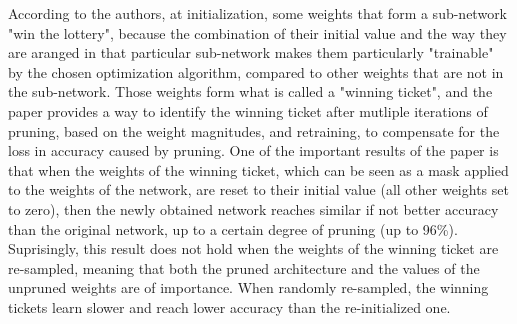 According to the authors, at initialization, some weights that form a sub-network "win the lottery", because the combination of their initial value and the way they are aranged in that particular sub-network makes them particularly "trainable" by the chosen optimization algorithm, compared to other weights that are not in the sub-network. Those weights form what is called a "winning ticket", and the paper provides a way to identify the winning ticket after mutliple iterations of pruning, based on the weight magnitudes, and retraining, to compensate for the loss in accuracy caused by pruning. One of the important results of the paper is that when the weights of the winning ticket, which can be seen as a mask applied to the weights of the network, are reset to their initial value (all other weights set to zero), then the newly obtained network reaches similar if not better accuracy than the original network, up to a certain degree of pruning (up to 96\%). Suprisingly, this result does not hold when the weights of the winning ticket are re-sampled, meaning that both the pruned architecture and the values of the unpruned weights are of importance. When randomly re-sampled, the winning tickets learn slower and reach lower accuracy than the re-initialized one. \\

